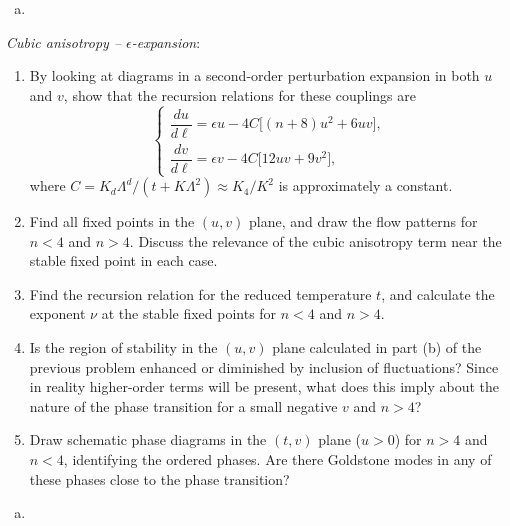 \begin{solution}
    \begin{enumerate}[(a)]
        \item
    \end{enumerate}
\end{solution}

\begin{problem}
    \textit{Cubic anisotropy -- $\epsilon$-expansion}:

    \begin{enumerate}
        \item[(a)] By looking at diagrams in a second-order perturbation expansion in both $u$ and $v$, show that the recursion relations for these couplings are
        \[
            \begin{cases}
                \dfrac{du}{d\ell} = \epsilon u - 4C\bigl[(n+8)u^2 + 6uv\bigr], \\[6pt]
                \dfrac{dv}{d\ell} = \epsilon v - 4C\bigl[12uv + 9v^2\bigr],
            \end{cases}
        \]
        where $C = K_d\Lambda^d/(t + K\Lambda^2) \approx K_4/K^2$ is approximately a constant.

        \item[(b)] Find all fixed points in the $(u,v)$ plane, and draw the flow patterns for $n < 4$ and $n > 4$. Discuss the relevance of the cubic anisotropy term near the stable fixed point in each case.

        \item[(c)] Find the recursion relation for the reduced temperature $t$, and calculate the exponent $\nu$ at the stable fixed points for $n < 4$ and $n > 4$.

        \item[(d)] Is the region of stability in the $(u,v)$ plane calculated in part (b) of the previous problem enhanced or diminished by inclusion of fluctuations? Since in reality higher-order terms will be present, what does this imply about the nature of the phase transition for a small negative $v$ and $n > 4$?

        \item[(e)] Draw schematic phase diagrams in the $(t,v)$ plane ($u > 0$) for $n > 4$ and $n < 4$, identifying the ordered phases. Are there Goldstone modes in any of these phases close to the phase transition?
    \end{enumerate}
\end{problem}

\begin{solution}
    \begin{enumerate}[(a)]
        \item
    \end{enumerate}
\end{solution}

